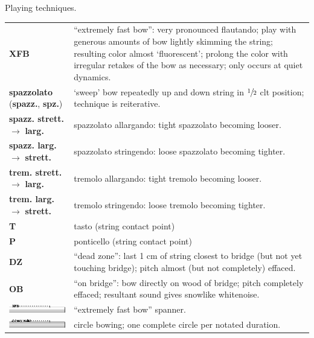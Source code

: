 \documentclass[10pt]{article}
\begin{document}
%
%

\begin{center}

{\huge Playing techniques.}

\end{center}

\begin{tabular}[t]{p{3.5cm} p{5cm}}
\textbf{XFB}
    & 
    ``extremely fast bow'': very pronounced flautando;
    play with generous amounts of bow lightly skimming the string;
    resulting color almost `fluorescent';
    prolong the color with irregular retakes of the bow as necessary;
    only occurs at quiet dynamics.
    \\[3.5cm] 
\textbf{spazzolato} \newline (\textbf{spazz.}, \textbf{spz.})
    &
    `sweep' bow repeatedly up and down string in $\sfrac{1}{2}$ clt position;
    technique is reiterative.
    \\
\textbf{spazz. strett.} \textbf{$\longrightarrow$} \textbf{larg.}
    &
    spazzolato allargando: tight spazzolato becoming looser.
    \\
\textbf{spazz. larg.} \textbf{$\longrightarrow$} \textbf{strett.}
    &
    spazzolato stringendo: loose spazzolato becoming tighter.
    \\[1cm]
\textbf{trem. strett.} \textbf{$\longrightarrow$} \textbf{larg.}
    &
    tremolo allargando: tight tremolo becoming looser.
    \\
\textbf{trem. larg.} \textbf{$\longrightarrow$} \textbf{strett.}
    &
    tremolo stringendo: loose tremolo becoming tighter.
    \\
\textbf{T} & tasto (string contact point)
    \\
\textbf{P} & ponticello (string contact point)
    \\
\textbf{DZ}
    &
    ``dead zone'': last 1 cm of string closest to bridge (but not yet touching
    bridge); pitch almost (but not completely) effaced.
    \\
\textbf{OB}
    &
    ``on bridge'': bow directly on wood of bridge;
    pitch completely effaced;
    resultant sound gives snowlike whitenoise.
    \\[2cm]
\includegraphics{../_assets/xfb-trimmed.png}
    &
    ``extremely fast bow'' spanner.
    \\[0.5cm]
\includegraphics{../_assets/circle-trimmed.png}
    &
    circle bowing;
    one complete circle per notated duration.
    \\
\end{tabular}
\end{document}
